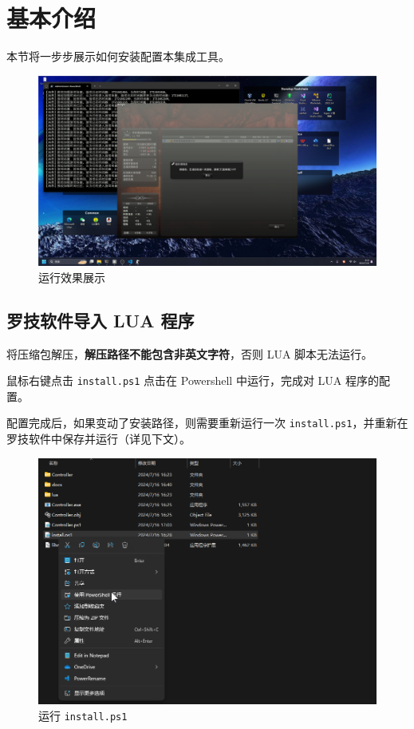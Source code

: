 \section{基本介绍}

本节将一步步展示如何安装配置本集成工具。

\begin{figure}[H]
    \Centering
    \includegraphics[width=\textwidth]{docs/assets/controller.png}
    \caption{运行效果展示}
\end{figure}

\subsection{罗技软件导入 LUA 程序}

将压缩包解压，\textbf{\color{red}解压路径不能包含非英文字符}，否则 LUA 脚本无法运行。

鼠标右键点击 \lstinline{install.ps1} 点击在 Powershell 中运行，完成对 LUA 程序的配置。

配置完成后，如果变动了安装路径，则需要重新运行一次 \lstinline{install.ps1}，并重新在罗技软件中保存并运行（详见下文）。

\begin{figure}[H]
    \Centering
    \includegraphics[width=\textwidth]{docs/assets/install.png}
    \caption{运行 \lstinline{install.ps1}}
\end{figure}

